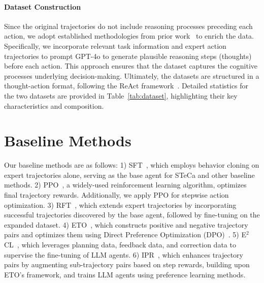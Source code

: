 \paragraph{Dataset Construction}
Since the original trajectories do not include reasoning processes preceding each action, we adopt established methodologies from prior work~\citep{song2024trial,xiong2024watch} to enrich the data. Specifically, we incorporate relevant task information and expert action trajectories to prompt GPT-4o to generate plausible reasoning steps (thoughts) before each action. This approach ensures that the dataset captures the cognitive processes underlying decision-making. Ultimately, the datasets are structured in a thought-action format, following the ReAct framework~\citep{yao2023react}. Detailed statistics for the two datasets are provided in Table~\ref{tab:dataset}, highlighting their key characteristics and composition.



\section{Baseline Methods}
\label{appendix:baselines}

Our baseline methods are as follows: 
1) SFT~\citep{chen2023fireact}, which employs behavior cloning on expert trajectories alone, serving as the base agent for STeCa and other baseline methods.
2) PPO~\citep{schulman2017proximal}, a widely-used reinforcement learning algorithm, optimizes final trajectory rewards. Additionally, we apply PPO for stepwise action optimization.
3) RFT~\citep{yuan2023scaling}, which extends expert trajectories by incorporating successful trajectories discovered by the base agent, followed by fine-tuning on the expanded dataset.
4) ETO~\citep{song2024trial}, which constructs positive and negative trajectory pairs and optimizes them using Direct Preference Optimization (DPO)~\citep{rafailov2024direct}.
5) E$^2$CL~\citep{wang-etal-2024-e2cl}, which leverages planning data, feedback data, and correction data to supervise the fine-tuning of LLM agents.
6) IPR~\citep{xiong2024watch}, which enhances trajectory pairs by augmenting sub-trajectory pairs based on step rewards, building upon ETO's framework, and trains LLM agents using preference learning methods.

\begin{table}[t!]
    \centering
    \caption{Statistics of the datasets for experiments.}
    \label{tab:dataset}
\end{table}


